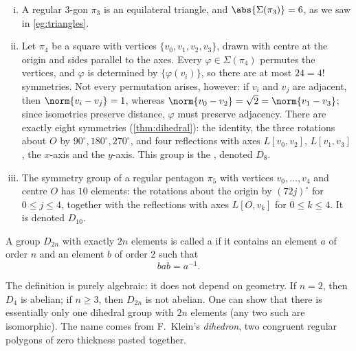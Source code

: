 \begin{eg}\label{eg:dihedral-examples}
	\begin{enumerate}[(i)]
		\item A regular \(3\)-gon \(\pi_3\) is an equilateral triangle, and
		      \(\abs{\Sigma(\pi_3)} = 6\), as we saw in \autoref{eg:triangles}.
		\item Let \(\pi_4\) be a square with vertices \(\{v_0, v_1, v_2, v_3\}\), drawn with
		      centre at the origin and sides parallel to the axes. Every
		      \(\varphi \in \Sigma(\pi_4)\) permutes the vertices, and \(\varphi\) is
		      determined by \(\{\varphi(v_i)\}\), so there are at most \(24 = 4!\)
		      symmetries. Not every permutation arises, however: if \(v_i\) and \(v_j\) are
		      adjacent, then \(\norm{v_i - v_j} = 1\), whereas
		      \(\norm{v_0 - v_2} = \sqrt{2} = \norm{v_1 - v_3}\); since isometries preserve
		      distance, \(\varphi\) must preserve adjacency. There are exactly eight
		      symmetries (\autoref{thm:dihedral}): the identity, the three rotations
		      about \(O\) by \(90^\circ, 180^\circ, 270^\circ\), and four reflections with
		      axes \(L[v_0,v_2]\), \(L[v_1,v_3]\), the \(x\)-axis and the \(y\)-axis. This
		      group is the , denoted \(D_8\).
		\item The symmetry group of a regular pentagon \(\pi_5\) with vertices
		      \(v_0, \dots, v_4\) and centre \(O\) has \(10\) elements: the rotations about
		      the origin by \((72j)^\circ\) for \(0 \leq j \leq 4\), together with the
		      reflections with axes \(L[O,v_k]\) for \(0 \leq k \leq 4\). It is denoted
		      \(D_{10}\).
	\end{enumerate}
\end{eg}

\begin{definition}
	A group \(D_{2n}\) with exactly \(2n\) elements is called a  if it
	contains an element \(a\) of order \(n\) and an element \(b\) of order \(2\) such that
	\[
		bab = a^{-1}.
	\]
\end{definition}

\begin{note}
	The definition is purely algebraic: it does not depend on geometry. If \(n = 2\), then
	\(D_4\) is abelian; if \(n \geq 3\), then \(D_{2n}\) is not abelian. One can show that
	there is essentially only one dihedral group with \(2n\) elements (any two such are
	isomorphic). The name comes from F.~Klein's \emph{dihedron}, two congruent regular
	polygons of zero thickness pasted together.
\end{note}

